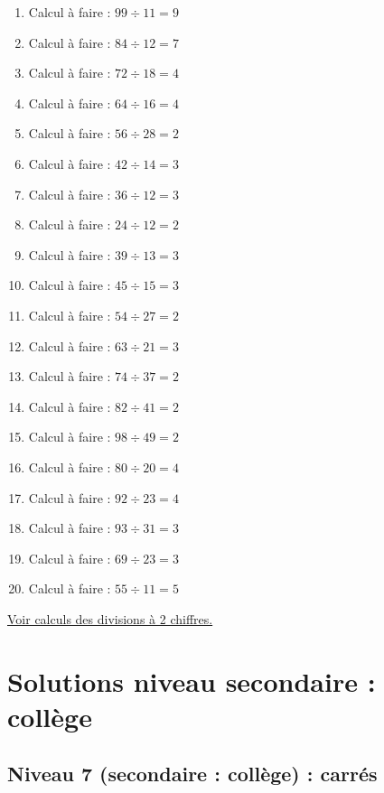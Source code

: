 \documentclass[11pt]{article}
\begin{document}
\begin{enumerate}
\item Calcul à faire :  \(99 \div 11 =  9\)
\item Calcul à faire :  \(84 \div 12 = 7\)
\item Calcul à faire :  \(72 \div 18 = 4\)
\item Calcul à faire :  \(64 \div 16 = 4\)
\item Calcul à faire :  \(56 \div 28 = 2\)
\item Calcul à faire :  \(42 \div 14 = 3\)
\item Calcul à faire :  \(36 \div 12 = 3\)
\item Calcul à faire :  \(24 \div 12 = 2\)
\item Calcul à faire :  \(39 \div 13 = 3\)
\item Calcul à faire :  \(45 \div 15 = 3\)
\item Calcul à faire :  \(54 \div 27 =  2\)
\item Calcul à faire :  \(63 \div 21 = 3\)
\item Calcul à faire :  \(74 \div 37 = 2\)
\item Calcul à faire :  \(82 \div 41 = 2\)
\item Calcul à faire :  \(98 \div 49 = 2\)
\item Calcul à faire :  \(80 \div 20 = 4\)
\item Calcul à faire :  \(92 \div 23 = 4\)
\item Calcul à faire :  \(93 \div 31 = 3\)
\item Calcul à faire :  \(69 \div 23 = 3\)
\item Calcul à faire :  \(55 \div 11 = 5\)
\end{enumerate}




\hyperref[orgdda3b20]{Voir calculs des divisions à 2 chiffres.}









\section{Solutions niveau secondaire : collège}
\label{sec:org5adf757}

\subsection{Niveau 7 (secondaire : collège) : carrés}
\label{sec:orgb334f8e}
\end{document}
